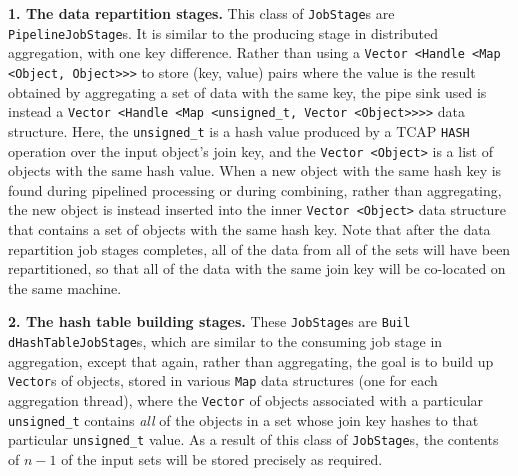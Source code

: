 \vspace{5pt}
{\bf 1. The data repartition stages.} This class of \texttt{JobStage}s are
\texttt{PipelineJobStage}s. It is similar to the producing stage in distributed
aggregation, with one key difference.
Rather than using a \texttt{Vector <Handle <Map <Object, Object}\texttt{>}\texttt{>}\texttt{>} to store (key, value) pairs where the value is the result obtained by aggregating a set of
data with the same key, the pipe sink used is instead a \texttt{Vector <Handle <Map <unsigned\_t, Vector <Object}\texttt{>}\texttt{>}\texttt{>}\texttt{>} data structure.  Here, the
\texttt{unsigned\_t} is a hash value produced by a TCAP \texttt{HASH} operation over the input object's join key, and the \texttt{Vector <Object>} is a list of objects
with the same hash value.  
When a new object with the same hash key is found during pipelined processing or during combining, rather than aggregating, the new object is instead inserted
into the inner \texttt{Vector <Object>} data structure that contains a set of objects with the same hash key.
Note that after the data repartition job stages completes, all of the data from all of the sets will have been repartitioned, so that all of the data with the same join
key will be co-located on the same machine.

\vspace{5pt}
{\bf 2. The hash table building stages.} These \texttt{JobStage}s are
\texttt{Buil dHashTableJobStage}s, which are similar to the consuming job stage in aggregation, 
except that again, rather than aggregating, the goal is to build up \texttt{Vector}s of objects, stored in various \texttt{Map} data structures (one for each
aggregation thread), where the \texttt{Vector} of objects associated with a particular 
\texttt{unsigned\_t} contains \emph{all} of the objects in a set whose join key hashes to that particular \texttt{unsigned\_t} value.
As a result of this class of \texttt{JobStage}s, the contents of $n - 1$ of the input sets will be stored precisely as required.

